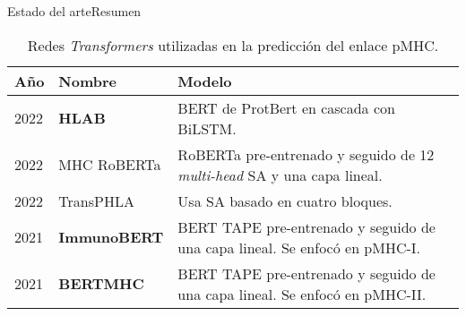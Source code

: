 \documentclass[10pt]{beamer}
\newcommand{\1}{
	\setbeamertemplate{background}{
		\texttt{[image: img/1]}
		\tikz[overlay] \fill[fill opacity=0.75,fill=white] (0,0) rectangle (-\paperwidth,\paperheight);
	}
}
\begin{document}
\begin{frame}{Estado del arte}{Resumen}
	
	
	\begin{table}[]
		\caption{Redes \textit{Transformers} utilizadas en la predicción del enlace pMHC.}
		\label{tab:transformes}
		\setlength{\tabcolsep}{0.6em} %
		{\renewcommand{\arraystretch}{1.6}%
			
			\begin{footnotesize}
				\begin{tabular}{p{1cm}p{1.5cm}p{7cm}}
					\multicolumn{1}{l}{\textbf{Año}}                                   & \textbf{Nombre}                       & \textbf{Modelo}     \\  \hline
					
					2022\cite{zhang2022hlab}&	\textbf{HLAB}&	BERT de ProtBert en cascada con BiLSTM.	\\
					
					2022\cite{wang2022mhcroberta}          & MHC RoBERTa             &  RoBERTa  pre-entrenado y seguido de 12 \textit{multi-head} SA y una capa lineal.                                                                                     \\
					2022\cite{chu2022transformer}          & TransPHLA                     & Usa SA basado en cuatro bloques. \\
					
					2021\cite{gasser2021interpreting}  & \textbf{ImmunoBERT}                              & BERT TAPE pre-entrenado y seguido de una capa lineal. Se enfocó en pMHC-I.  \\
					
					2021\cite{cheng2021bertmhc}             & \textbf{BERTMHC}                            & BERT TAPE pre-entrenado y seguido de una capa lineal. Se enfocó en pMHC-II. \\
					
				\end{tabular}
			\end{footnotesize}
		}
	\end{table}
	
	
\end{frame}
\end{document}
